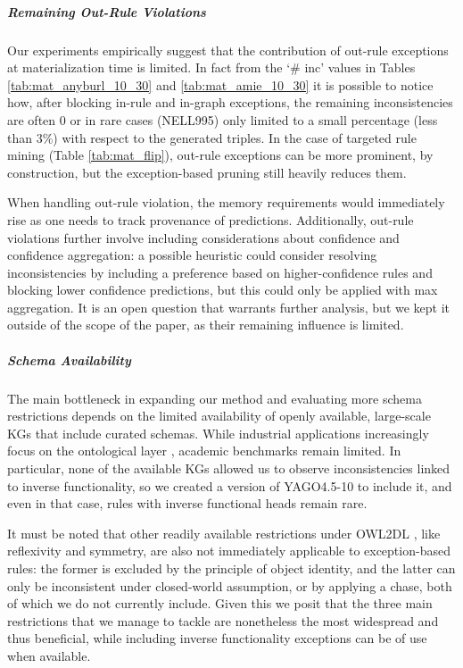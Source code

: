 \documentclass[a4paper,UKenglish,cleveref, autoref, thm-restate]{tgdk-v2021}
\begin{document}
\subparagraph{Remaining Out-Rule Violations} 
Our experiments empirically suggest that the contribution of out-rule exceptions at materialization time is limited. In fact from the `\# inc' values in Tables \ref{tab:mat_anyburl_10_30} and \ref{tab:mat_amie_10_30} it is possible to notice how, after blocking in-rule and in-graph exceptions, the remaining inconsistencies are often 0 or in rare cases (NELL995) only limited to a small percentage (less than 3\%) with respect to the generated triples. In the case of targeted rule mining (Table \ref{tab:mat_flip}), out-rule exceptions can be more prominent, by construction, but the exception-based pruning still heavily reduces them.

When handling out-rule violation, the memory requirements would immediately rise as one needs to track provenance of predictions. Additionally, out-rule violations further involve including considerations about confidence and confidence aggregation: a possible heuristic could consider resolving inconsistencies by including a preference based on higher-confidence rules and blocking lower confidence predictions, but this could only be applied with max aggregation. It is an open question that warrants further analysis, but we kept it outside of the scope of the paper, as their remaining influence is limited.

\subparagraph{Schema Availability} 
The main bottleneck in expanding our method and evaluating more schema restrictions depends on the limited availability of openly available, large-scale KGs that include curated schemas. While industrial applications increasingly focus on the ontological layer \cite{hofer_construction_2024}, academic benchmarks remain limited. In particular, none of the available KGs allowed us to observe inconsistencies linked to inverse functionality, so we created a version of YAGO4.5-10 to include it, and even in that case, rules with inverse functional heads remain rare. 

It must be noted that other readily available restrictions under OWL2DL \cite{motik_owl_2012}, like reflexivity and symmetry, are also not immediately applicable to exception-based rules: the former is excluded by the principle of object identity, and the latter can only be inconsistent under closed-world assumption, or by applying a chase, both of which we do not currently include. Given this we posit that the three main restrictions that we manage to tackle are nonetheless the most widespread and thus beneficial, while including inverse functionality exceptions can be of use when available.
\end{document}

